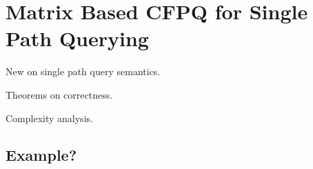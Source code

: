 \section{Matrix Based CFPQ for Single Path Querying}

New on single path query semantics.

Theorems on correctness.

Complexity analysis.

\subsection{Example?}
